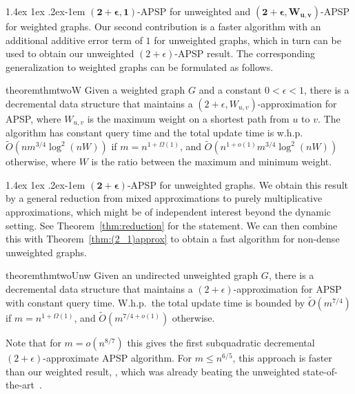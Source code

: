\documentclass[11pt]{article}
\makeatletter
\theoremstyle{definition}
\theoremstyle{remark}
\renewcommand{\paragraph}{%
  \@startsection{paragraph}{4}%
  {\z@}{1.4ex \@plus 1ex \@minus .2ex}{-1em}%
  {\normalfont\normalsize\bfseries}%
}
\makeatother
\begin{document}
\paragraph{$\mathbf{(2+\epsilon, 1)}$-APSP for unweighted and $\mathbf{(2+\epsilon, W_{u,v})}$-APSP for weighted graphs.} 
Our second contribution is a faster algorithm with an additional additive error term of $1$ for unweighted graphs, which in turn can be used to obtain our unweighted $(2+\epsilon)$-APSP result.
The corresponding generalization to weighted graphs can be formulated as follows.

\begin{restatable}{theorem}{thmtwoW}\label{thm:(2_1)approx}
    Given a weighted graph $G$ and a constant $0 < \epsilon < 1$, there is a decremental data structure that maintains a $(2+\epsilon,W_{u,v})$-approximation for APSP, where $W_{u,v}$ is the maximum weight on a shortest path from $u$ to $v$. The algorithm has constant query time and the total update time is w.h.p.~$\tilde O( nm^{3/4}\log^2(nW))$ if $m=n^{1+\Omega(1)}$, and $\tilde O( n^{1+o(1)}m^{3/4}\log^2(nW))$ otherwise, where $W$ is the ratio between the maximum and minimum weight. 
\end{restatable}

\paragraph{$\mathbf{(2+\epsilon)}$-APSP for unweighted graphs.}
We obtain this result by a general reduction from mixed approximations to purely multiplicative approximations, which might be of independent interest beyond the dynamic setting. See Theorem~\ref{thm:reduction} for the statement. We can then combine this with Theorem~\ref{thm:(2_1)approx} to obtain a fast algorithm for non-dense unweighted graphs. 

\begin{restatable}{theorem}{thmtwoUnw}\label{thm:unweighted_2}
    Given an undirected unweighted graph $G$, there is a decremental data structure that maintains a $(2+\epsilon)$-approximation for APSP with constant query time. W.h.p.\ the total update time is bounded by $\tilde O( m^{7/4})$ if $m=n^{1+\Omega(1)}$, and $\tilde O( m^{7/4+o(1)})$ otherwise.
\end{restatable}

Note that for $m=o(n^{8/7})$ this gives the first subquadratic decremental $(2+\epsilon)$-approximate APSP algorithm. 
For $m\leq n^{6/5}$, this approach is faster than our weighted result, , which was already beating the unweighted state-of-the-art~\cite{AbrahamC13,HKN2016}. 
\end{document}
